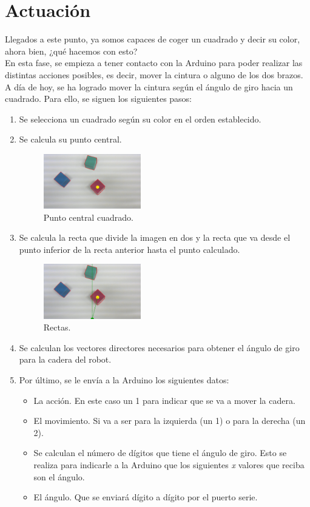 \documentclass[11pt]{article}
\begin{document}
\section{Actuación}
Llegados a este punto, ya somos capaces de coger un cuadrado y decir su color, ahora bien, ¿qué hacemos con esto?\\
En esta fase, se empieza a tener contacto con la Arduino para poder realizar las distintas acciones posibles, es decir, mover la cintura o alguno de los dos brazos.\\
A día de hoy, se ha logrado mover la cintura según el ángulo de giro hacia un cuadrado. Para ello, se siguen los siguientes pasos:

\begin{enumerate}
\item Se selecciona un cuadrado según su color en el orden establecido.
\item Se calcula su punto central.
\begin{figure}[h!]
  \centering
      \includegraphics[width=0.4\textwidth]{img12}
  \caption{Punto central cuadrado.}
\end{figure}
\newpage

\item Se calcula la recta que divide la imagen en dos y la recta que va desde el punto inferior de la recta anterior hasta el punto calculado.
\begin{figure}[h!]
  \centering
      \includegraphics[width=0.4\textwidth]{img13}
  \caption{Rectas.}
\end{figure}

\item Se calculan los vectores directores necesarios para obtener el ángulo de giro para la cadera del robot.

\item Por último, se le envía a la Arduino los siguientes datos:
	\begin{itemize}
	\item La acción. En este caso un 1 para indicar que se va a mover la cadera.
	\item El movimiento. Si va a ser para la izquierda (un 1) o para la derecha (un 2).
	\item Se calculan el número de dígitos que tiene el ángulo de giro. Esto se realiza para indicarle a la Arduino que los siguientes \textit{x} valores que reciba son el ángulo.
	\item El ángulo. Que se enviará dígito a dígito por el puerto serie.
	\end{itemize}


\end{enumerate}
\end{document}
